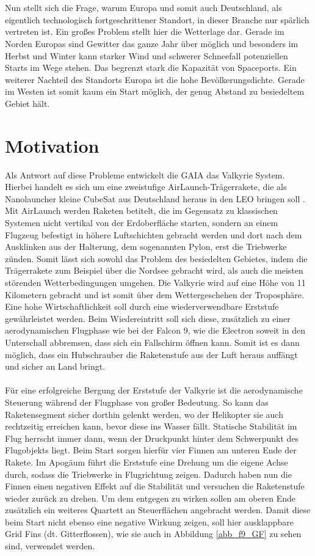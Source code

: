 \\~\\
Nun stellt sich die Frage, warum Europa und somit auch Deutschland, als eigentlich technologisch fortgeschrittener Standort, in dieser Branche nur spärlich vertreten ist. Ein großes Problem stellt hier die Wetterlage dar. Gerade im Norden Europas sind Gewitter das ganze Jahr über möglich und besonders im Herbst und Winter kann starker Wind und schwerer Schneefall potenziellen Starts im Wege stehen. Das begrenzt stark die Kapazität von Spaceports. Ein weiterer Nachteil des Standorts Europa ist die hohe Bevölkerungsdichte. Gerade im Westen ist somit kaum ein Start möglich, der genug Abstand zu besiedeltem Gebiet hält.

\section{Motivation}

Als Antwort auf diese Probleme entwickelt die \gls{GAIA} das Valkyrie System. Hierbei handelt es sich um eine zweistufige AirLaunch-Trägerrakete, die als  Nanolauncher kleine CubeSat aus Deutschland heraus in den LEO bringen soll \cite{GAIA}. Mit AirLaunch werden Raketen betitelt, die im Gegensatz zu klassischen Systemen nicht vertikal von der Erdoberfläche starten, sondern an einem Flugzeug befestigt in höhere Luftschichten gebracht werden und dort nach dem Ausklinken aus der Halterung, dem sogenannten Pylon, erst die Triebwerke zünden. Somit lässt sich sowohl das Problem des besiedelten Gebietes, indem die Trägerrakete zum Beispiel über die Nordsee gebracht wird, als auch die meisten störenden Wetterbedingungen umgehen. Die Valkyrie wird auf eine Höhe von 11 Kilometern gebracht \cite{flugbahnBarz} und ist somit über dem Wettergeschehen der Troposphäre. Eine hohe Wirtschaftlichkeit soll durch eine wiederverwendbare Erststufe gewährleistet werden. Beim Wiedereintritt soll sich diese, zusätzlich zu einer aerodynamischen Flugphase wie bei der Falcon 9, wie die Electron soweit in den Unterschall abbremsen, dass sich ein Fallschirm öffnen kann. Somit ist es dann möglich, dass ein Hubschrauber die Raketenstufe aus der Luft heraus auffängt und sicher an Land bringt.
\\~\\
Für eine erfolgreiche Bergung der Erststufe der Valkyrie ist die aerodynamische Steuerung während der Flugphase von großer Bedeutung. So kann das Raketensegment sicher dorthin gelenkt werden, wo der Helikopter sie auch rechtzeitig erreichen kann, bevor diese ins Wasser fällt. Statische Stabilität im Flug herrscht immer dann, wenn der Druckpunkt hinter dem Schwerpunkt des Flugobjekts liegt. Beim Start sorgen hierfür vier Finnen am unteren Ende der Rakete. Im Apogäum führt die Erststufe eine Drehung um die eigene Achse durch, sodass die Triebwerke in Flugrichtung zeigen. Dadurch haben nun die Finnen einen negativen Effekt auf die Stabilität und versuchen die Raketenstufe wieder zurück zu drehen. Um dem entgegen zu wirken sollen am oberen Ende zusätzlich ein weiteres Quartett an Steuerflächen angebracht werden. Damit diese beim Start nicht ebenso eine negative Wirkung zeigen, soll hier ausklappbare Grid Fins (dt. Gitterflossen), wie sie auch in Abbildung \ref{abb_f9_GF} zu sehen sind, verwendet werden.

